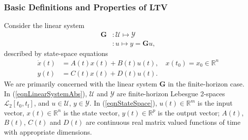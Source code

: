 \documentclass[12pt,xcolor={table},aspectratio=169]{beamer}
\begin{document}


\begin{frame}[noframenumbering]
    \frametitle{Basic Definitions and Properties of LTV}
    \tiny
Consider the linear system 
\begin{equation}
\label{eqnLinearSystemAbs}
\begin{aligned}
 \bm{G} &: \mathcal{U} \mapsto \mathcal{Y}\\
  & : u \mapsto y = \bm{G}u,
\end{aligned}
\end{equation}
described by state-space equations
\begin{equation}
\label{eqnStateSpace}
 \begin{aligned}
        \dot{x}(t) &= A(t)x(t)+B(t)u(t), \quad x(t_0) = x_0 \in \mathbb{R}^n \\
        y(t) & = C(t)x(t)+D(t)u(t).
 \end{aligned}
\end{equation}
We are primarily concerned with the linear system $\bm{G}$ in the finite-horizon case. In (\ref{eqnLinearSystemAbs}), $\mathcal{U}$ and $\mathcal{Y}$ are finite-horizon Lebesgue 2-spaces $\mathcal{L}_2[t_0, t_{\mathrm{f}}]$, and $u \in \mathcal{U}$, $y \in \mathcal{Y}$.
In (\ref{eqnStateSpace}), $u(t)\in \mathbb{R}^m$ is the input vector, $x(t)\in \mathbb{R}^n$ is the state vector, $y(t)\in \mathbb{R}^p$ is the output vector; $A(t)$, $B(t)$, $C(t)$ and $D(t)$ are continuous real matrix valued functions of time with appropriate dimensions.


\end{frame}
\end{document}
